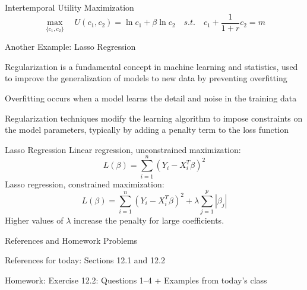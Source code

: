 \documentclass{./../../Latex/teaching_slides}
\begin{document}
\begin{frame}{Intertemporal Utility Maximization}
\vspace{-1.5em}
$$ \max_{\{c_1,c_2\}} \quad U(c_1, c_2) = \ln c_1 + \beta \ln c_2 \quad s.t. \quad c_1 + \frac{1}{1+r} c_2 = m $$
\end{frame}

\begin{frame}{Another Example: Lasso Regression}
\begin{witemize}
  \item Regularization is a fundamental concept in machine learning and statistics, used to improve the generalization of models to new data by preventing overfitting
  \item  Overfitting occurs when a model learns the detail and noise in the training data 
  \item Regularization techniques modify the learning algorithm to impose constraints on the model parameters, typically by adding a penalty term to the loss function
\end{witemize}
\end{frame}

\begin{frame}{Lasso Regression}
Linear regression, unconstrained maximization:
$$ L(\beta) = \sum_{i=1}^n (Y_i - X_i^T \beta)^2 $$
Lasso regression, constrained maximization:
$$L(\beta) = \sum_{i=1}^n (Y_i - X_i^T \beta)^2 + \lambda \sum_{j=1}^p |\beta_j|$$
 Higher values of $\lambda $ increase the penalty for large coefficients.
\end{frame}


\begin{frame}{References and Homework Problems}
	\begin{witemize}
  \item References for today: Sections 12.1 and 12.2
  \item Homework: Exercise 12.2: Questions 1--4 + Examples from today's class
\end{witemize}
\end{frame}
\end{document}
